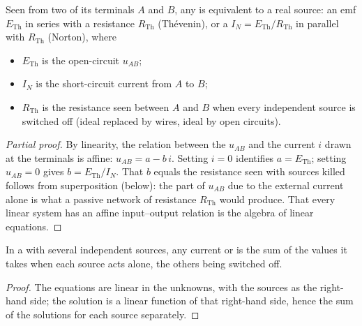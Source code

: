 \begin{theorem}\label{thm:b1:dc-circuits:thevenin}
Seen from two of its terminals $A$ and $B$, any  is
equivalent to a real source: an emf $E_{\mathrm{Th}}$ in series with a
resistance $R_{\mathrm{Th}}$ (Thévenin), or a  $I_N =
E_{\mathrm{Th}}/R_{\mathrm{Th}}$ in parallel with $R_{\mathrm{Th}}$
(Norton), where
\begin{itemize}
  \item $E_{\mathrm{Th}}$ is the open-circuit  $u_{AB}$;
  \item $I_N$ is the short-circuit current from $A$ to $B$;
  \item $R_{\mathrm{Th}}$ is the resistance seen between $A$ and $B$
        when every independent source is switched off (ideal  replaced by wires, ideal  by open
        circuits).
\end{itemize}
\end{theorem}

\begin{proof}[Partial proof]
By linearity, the relation between the  $u_{AB}$ and the current
$i$ drawn at the terminals is affine: $u_{AB} = a - b\,i$. Setting
$i = 0$ identifies $a = E_{\mathrm{Th}}$; setting $u_{AB} = 0$ gives
$b = E_{\mathrm{Th}}/I_N$. That $b$ equals the resistance seen with
sources killed follows from superposition (below): the part of $u_{AB}$
due to the external current alone is what a passive network of
resistance $R_{\mathrm{Th}}$ would produce. That every linear system has
an affine input--output relation is the algebra of linear equations.
\end{proof}

\begin{theorem}[Superposition]\label{thm:b1:dc-circuits:superposition}
In a  with several independent sources, any current or
 is the sum of the values it takes when each source acts alone,
the others being switched off.
\end{theorem}

\begin{proof}
The equations are linear in the unknowns, with the sources as the
right-hand side; the solution is a linear function of that right-hand
side, hence the sum of the solutions for each source separately.
\end{proof}

